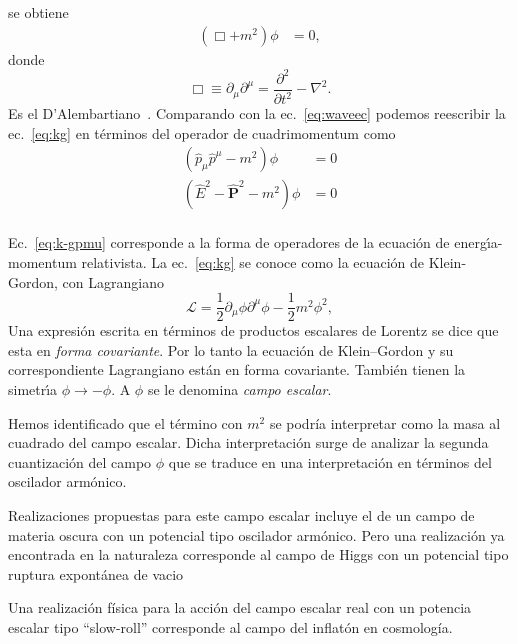 \begin{frame}
se obtiene
\begin{align}
  \label{eq:kg} 
  (\Box+m^2)\phi&=0,
\end{align}
donde
\begin{equation}
  \label{eq:dalambertiano}
  \Box\equiv\partial_\mu\partial^\mu=\frac{\partial^2}{\partial t^2}-\nabla^2. 
\end{equation}
Es el D'Alembartiano~\cite{daelembertiano}.
Comparando con la ec.~\eqref{eq:waveec} podemos reescribir la ec.~\eqref{eq:kg} en términos del operador de cuadrimomentum como
\begin{align}
  (\hat{p}_\mu\hat{p}^\mu-m^2)\phi&=0\nonumber\\
  \label{eq:k-gpmu} %
(\hat{E}^2-\hat{\boldsymbol{P}}^2-m^2)\phi&=0\\
\end{align}
\end{frame}
Ec.~\eqref{eq:k-gpmu} %
corresponde a la forma de operadores de la
ecuaci\'on de energ\'\i a-momentum relativista. La
ec.~\eqref{eq:kg} se conoce como la ecuaci\'on de Klein-Gordon, con
Lagrangiano
\begin{equation}
  \label{eq:kglag}
  \mathcal{L}=\frac{1}{2}\partial_\mu\phi\partial^\mu\phi-\frac{1}{2}m^2\phi^2, 
\end{equation}
Una expresi\'on escrita en t\'erminos de productos escalares de
Lorentz se dice que esta en \emph{forma covariante}. Por lo tanto la
ecuaci\'on de Klein--Gordon y su correspondiente Lagrangiano est\'an
en forma covariante. Tambi\'en tienen la simetr\'\i a
$\phi\to-\phi$. A $\phi$ se le denomina \emph{campo escalar}.

\begin{frame}
Hemos identificado que el término con $m^2$ se podría interpretar como la masa al cuadrado del campo escalar. Dicha interpretación surge de analizar la segunda cuantización del campo $\phi$ que se traduce en una interpretación en términos del oscilador armónico.
\end{frame}

Realizaciones propuestas para este campo escalar incluye el de un campo de materia oscura con un potencial tipo oscilador armónico.
Pero una realización ya encontrada en la naturaleza corresponde al campo de Higgs con un potencial tipo ruptura expontánea de vacio

Una realización física para la acción del campo escalar real con un potencia escalar tipo ``slow-roll''  corresponde al campo del inflatón en cosmología.



